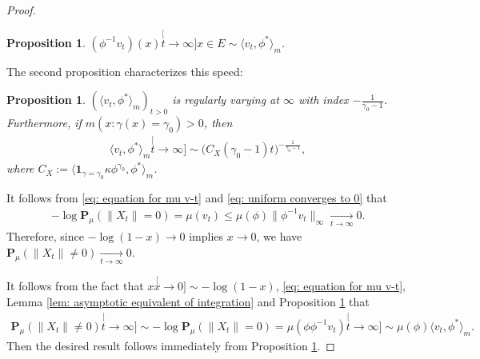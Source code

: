 \documentclass[12pt,a4paper]{amsart}
\newtheorem{prop}[thm]{Proposition}
\theoremstyle{definition}
\numberwithin{equation}{section}
\begin{document}
\begin{proof}
  \begin{prop}
    \label{prop: convergence in a same speed}
    $(\phi^{-1}v_t)(x) \stackrel[t\to\infty]{x\in E}{\sim} \langle v_t,\phi^*\rangle_m$.
  \end{prop}
  \label{prop: asymptotic equivalence of vtphi}
  The second proposition characterizes this speed:
  \begin{prop}
    \label{prop: regularly varying of vt-phi-star}
    $(\langle v_t,\phi^*\rangle_m)_{t> 0} $ is regularly varying at $\infty$ with index $-\frac{1}{\gamma_0-1}$.
    Furthermore, if $m(x: \gamma (x)= \gamma_0)>0$, then
    \begin{align}
      \langle v_t,\phi^*\rangle_m
      \stackrel[t\to \infty]{}{\sim} \big(C_X(\gamma_0-1) t \big)^{-\frac{1}{\gamma_0 - 1}},
    \end{align}
    where $C_X:= \langle \mathbf 1_{\gamma= \gamma_0} \kappa \phi^{\gamma_0}, \phi^* \rangle_m $.
  \end{prop}
  It follows from \eqref{eq: equation for mu v-t} and \eqref{eq: uniform converges to 0} that
    \begin{align}
      - \log \mathbf P_\mu(\|X_t\| = 0)
      = \mu(v_t)
      \leq \mu(\phi) \| \phi^{-1} v_t\|_{\infty}
      \xrightarrow[t\to \infty]{} 0.
    \end{align}
    Therefore, since $- \log (1-x) \to 0$ implies $x \to 0$, we have $\mathbf P_\mu(\|X_t\| \neq 0) \xrightarrow[t\to \infty]{} 0$.


    It follows from the fact that $x \stackrel[x\to 0]{}{\sim} - \log(1-x)$, \eqref{eq: equation for mu v-t}, Lemma \ref{lem: asymptotic equivalent of integration} and Proposition \ref{prop: convergence in a same speed} that
    \begin{align}
      \mathbf P_\mu(\|X_t\| \neq 0)
      \stackrel[t\to \infty]{}{\sim} - \log \mathbf P_\mu(\|X_t\| = 0)
      = \mu(\phi \phi^{-1}v_t)
      \stackrel[t\to\infty]{}{\sim} \mu(\phi) \langle v_t, \phi^*\rangle_m.
    \end{align}
    Then the desired result follows immediately from Proposition \ref{prop: regularly varying of vt-phi-star}.
\end{proof}
\end{document}
